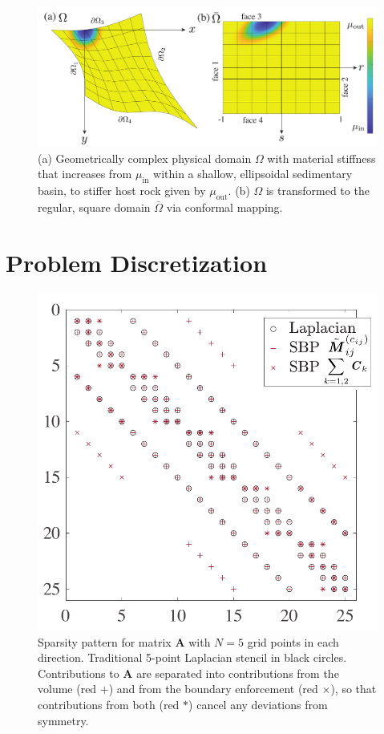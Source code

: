 \begin{figure}
    \centering
     \includegraphics[width=\linewidth]{figures/grid_transformation.pdf}
    \caption{(a) Geometrically complex physical domain $\Omega$ with material stiffness that increases from $\mu_\text{in}$ within a shallow, ellipsoidal sedimentary basin, to stiffer host rock given by $\mu_\text{out}$.  (b) $\Omega$ is transformed to the regular, square domain $\bar{\Omega}$ via conformal mapping.} 
\end{figure}



\section{Problem Discretization}


\begin{figure}
    \centering
     \includegraphics[width=\linewidth]{figures/iccs_spy_3.pdf}
    \caption{Sparsity pattern for matrix $\boldsymbol{A}$ with $N = 5$ grid points in each direction.  Traditional 5-point Laplacian stencil in black circles. Contributions to $\boldsymbol{A}$ are separated into contributions from the volume (red $+$) and from the boundary enforcement (red $\times$), so that contributions from both (red $\ast$) cancel any deviations from symmetry.} 
    \label{fig:sparsity_A}
\end{figure}

